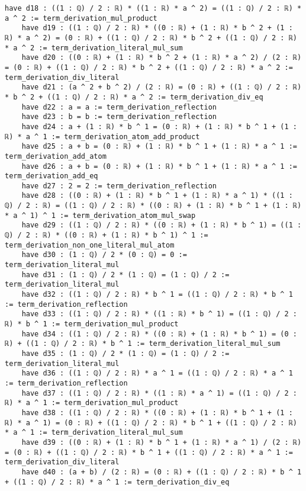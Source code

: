 \documentclass{article}
\begin{document}
\begin{tcolorbox}[colback=white!10, width=\linewidth]
\begin{lstlisting}[language=Lean4]
    have d18 : ((1 : ℚ) / 2 : ℝ) * ((1 : ℝ) * a ^ 2) = ((1 : ℚ) / 2 : ℝ) * a ^ 2 := term_derivation_mul_product
    have d19 : ((1 : ℚ) / 2 : ℝ) * ((0 : ℝ) + (1 : ℝ) * b ^ 2 + (1 : ℝ) * a ^ 2) = (0 : ℝ) + ((1 : ℚ) / 2 : ℝ) * b ^ 2 + ((1 : ℚ) / 2 : ℝ) * a ^ 2 := term_derivation_literal_mul_sum
    have d20 : ((0 : ℝ) + (1 : ℝ) * b ^ 2 + (1 : ℝ) * a ^ 2) / (2 : ℝ) = (0 : ℝ) + ((1 : ℚ) / 2 : ℝ) * b ^ 2 + ((1 : ℚ) / 2 : ℝ) * a ^ 2 := term_derivation_div_literal
    have d21 : (a ^ 2 + b ^ 2) / (2 : ℝ) = (0 : ℝ) + ((1 : ℚ) / 2 : ℝ) * b ^ 2 + ((1 : ℚ) / 2 : ℝ) * a ^ 2 := term_derivation_div_eq
    have d22 : a = a := term_derivation_reflection
    have d23 : b = b := term_derivation_reflection
    have d24 : a + (1 : ℝ) * b ^ 1 = (0 : ℝ) + (1 : ℝ) * b ^ 1 + (1 : ℝ) * a ^ 1 := term_derivation_atom_add_product
    have d25 : a + b = (0 : ℝ) + (1 : ℝ) * b ^ 1 + (1 : ℝ) * a ^ 1 := term_derivation_add_atom
    have d26 : a + b = (0 : ℝ) + (1 : ℝ) * b ^ 1 + (1 : ℝ) * a ^ 1 := term_derivation_add_eq
    have d27 : 2 = 2 := term_derivation_reflection
    have d28 : ((0 : ℝ) + (1 : ℝ) * b ^ 1 + (1 : ℝ) * a ^ 1) * ((1 : ℚ) / 2 : ℝ) = ((1 : ℚ) / 2 : ℝ) * ((0 : ℝ) + (1 : ℝ) * b ^ 1 + (1 : ℝ) * a ^ 1) ^ 1 := term_derivation_atom_mul_swap
    have d29 : ((1 : ℚ) / 2 : ℝ) * ((0 : ℝ) + (1 : ℝ) * b ^ 1) = ((1 : ℚ) / 2 : ℝ) * ((0 : ℝ) + (1 : ℝ) * b ^ 1) ^ 1 := term_derivation_non_one_literal_mul_atom
    have d30 : (1 : ℚ) / 2 * (0 : ℚ) = 0 := term_derivation_literal_mul
    have d31 : (1 : ℚ) / 2 * (1 : ℚ) = (1 : ℚ) / 2 := term_derivation_literal_mul
    have d32 : ((1 : ℚ) / 2 : ℝ) * b ^ 1 = ((1 : ℚ) / 2 : ℝ) * b ^ 1 := term_derivation_reflection
    have d33 : ((1 : ℚ) / 2 : ℝ) * ((1 : ℝ) * b ^ 1) = ((1 : ℚ) / 2 : ℝ) * b ^ 1 := term_derivation_mul_product
    have d34 : ((1 : ℚ) / 2 : ℝ) * ((0 : ℝ) + (1 : ℝ) * b ^ 1) = (0 : ℝ) + ((1 : ℚ) / 2 : ℝ) * b ^ 1 := term_derivation_literal_mul_sum
    have d35 : (1 : ℚ) / 2 * (1 : ℚ) = (1 : ℚ) / 2 := term_derivation_literal_mul
    have d36 : ((1 : ℚ) / 2 : ℝ) * a ^ 1 = ((1 : ℚ) / 2 : ℝ) * a ^ 1 := term_derivation_reflection
    have d37 : ((1 : ℚ) / 2 : ℝ) * ((1 : ℝ) * a ^ 1) = ((1 : ℚ) / 2 : ℝ) * a ^ 1 := term_derivation_mul_product
    have d38 : ((1 : ℚ) / 2 : ℝ) * ((0 : ℝ) + (1 : ℝ) * b ^ 1 + (1 : ℝ) * a ^ 1) = (0 : ℝ) + ((1 : ℚ) / 2 : ℝ) * b ^ 1 + ((1 : ℚ) / 2 : ℝ) * a ^ 1 := term_derivation_literal_mul_sum
    have d39 : ((0 : ℝ) + (1 : ℝ) * b ^ 1 + (1 : ℝ) * a ^ 1) / (2 : ℝ) = (0 : ℝ) + ((1 : ℚ) / 2 : ℝ) * b ^ 1 + ((1 : ℚ) / 2 : ℝ) * a ^ 1 := term_derivation_div_literal
    have d40 : (a + b) / (2 : ℝ) = (0 : ℝ) + ((1 : ℚ) / 2 : ℝ) * b ^ 1 + ((1 : ℚ) / 2 : ℝ) * a ^ 1 := term_derivation_div_eq

\end{lstlisting}
\end{tcolorbox}
\end{document}
